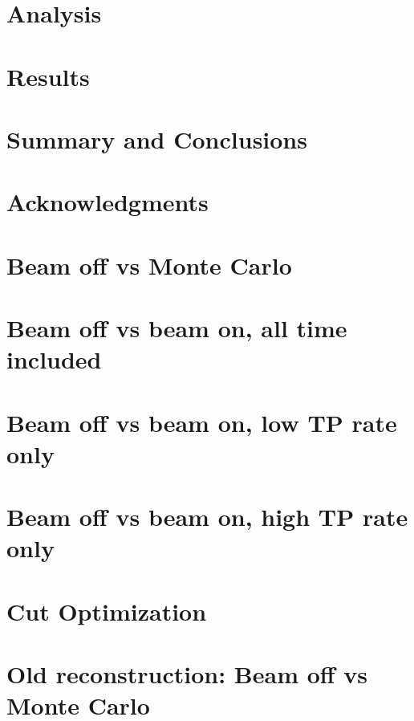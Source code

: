 \documentclass[a4paper,11pt]{article}
\begin{document}
\section{Analysis}


\clearpage
\section{Results}


\section{Summary and Conclusions}

\section{Acknowledgments}





\clearpage

\appendix
\section{Beam off vs Monte Carlo}

\clearpage
\section{Beam off vs beam on, all time included}

\clearpage
\section{Beam off vs beam on, low TP rate only}

\clearpage
\section{Beam off vs beam on, high TP rate only}

\clearpage
\section{Cut Optimization}

\clearpage
\section{Old reconstruction: Beam off vs Monte Carlo}

\clearpage
\end{document}
